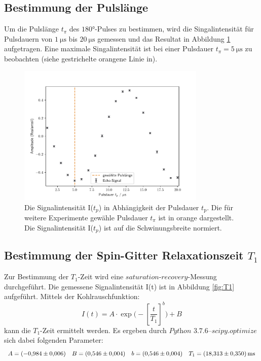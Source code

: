 \subsection{Bestimmung der Pulslänge}
\label{sec:pulslaenge}
Um die Pulslänge $t_{\pi}$ des $180°$-Pulses zu bestimmen, wird die Singalintensität für
Pulsdauern von $\SI{1}{\micro\second}$ bis $\SI{20}{\micro\second}$ gemessen und das
Resultat in Abbildung \ref{fig:pulslaenge} aufgetragen. Eine maximale Singalintensität
ist bei einer Pulsdauer $t_{\pi} = \SI{5}{\micro\second}$ zu beobachten (siehe gestrichelte
orangene Linie in).

\begin{figure}[H]
    \centering
    \includegraphics[width=0.8\textwidth]{Auswertung/pulslaenge.pdf}
    \caption{Die Signalintensität I($t_p$) in Abhängigkeit der Pulsdauer $t_{\text{p}}$. Die für weitere
    Experimente gewähle Pulsdauer $t_{\pi}$ ist in orange dargestellt. Die Signalintensität I($t_p$)
    ist auf die Schwinungsbreite normiert.}
    \label{fig:pulslaenge}
\end{figure}

\subsection{Bestimmung der Spin-Gitter Relaxationszeit $T_1$}
\label{sec:T1}
Zur Bestimmung der $T_1$-Zeit wird eine $\textit{saturation-recovery}$-Messung
durchgeführt. Die gemessene Signalintensität I(t) ist in Abbildung \ref{fig:T1}
aufgeführt. Mittels der Kohlrauschfunktion:
\begin{equation}
    I(t) = A \cdot \exp\biggl(-\left[\frac{t}{T_1} \right]^b
    \biggr) + B
\end{equation}
\noindent
kann die $T_1$-Zeit ermittelt werden. Es ergeben durch
$\textit{Python 3.7.6--scipy.optimize}$ sich dabei folgenden Parameter:
\begin{equation*}
  A = \SI{-0,984\pm0,006}{}
  \quad
  B = \SI{0,546\pm0,004}{}
  \quad
  b = \SI{0,546\pm0,004}{}
  \quad
  T_1 = \SI{18.313\pm0.350}{\milli\second}
\end{equation*}
\noindent

